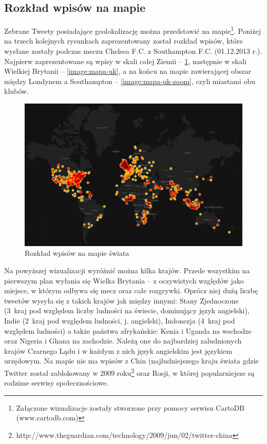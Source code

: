 

\clearpage
\subsection{Rozkład wpisów na mapie}
\label{subsection:rozkladnamapie}
Zebrane Tweety posiadające geolokalizację można przedstawić na
mapie\footnote{Załączone wizualizacje zostały stworzone przy pomocy serwisu
CartoDB (www.cartodb.com)}.
Poniżej na trzech kolejnych rysunkach zaprezentowany został rozkład wpisów,
które wysłane zostały podczas meczu Chelsea F.C. z Southampton F.C.
(01.12.2013 r.). Najpierw zaprezentowane są wpisy w skali całej Ziemii --
\ref{image:mapa-swiata}, następnie w skali Wielkiej Brytanii --
\ref{image:mapa-uk}, a na końcu na mapie zawierającej obszar między Londynem a
Southampton -- \ref{image:mapa-uk-zoom}, czyli miastami obu klubów.

\begin{figure}[ht!]
\centering
\includegraphics[width=140mm]{img/geo-chelsea-southampton.png}
\caption{Rozkład wpisów na mapie świata}
\label{image:mapa-swiata}
\end{figure}

Na powyższej wizualizacji wyróżnić można kilka krajów. Przede wszystkim na
pierwszym plan wyłania się Wielka Brytania -- z oczywistych względów jako
miejsce, w którym odbywa się mecz oraz całe rozgrywki. Oprócz niej dużą liczbę
tweetów wysyła się z takich krajów jak między innymi:
Stany Zjednoczone (3~kraj pod względem liczby ludności na świecie, dominujący
język angielski), Indie (2~kraj pod względem ludności, j. angielski), Indonezja
(4~kraj pod względem ludności) a także państwa afrykańskie: Kenia i Uganda na
wschodze oraz Nigeria i Ghana na zachodzie. Należą one do najbardziej
zaludnionych krajów Czarnego Lądu i w każdym z nich język angielskim jest
językiem urzędowym.
Na mapie nie ma wpisów z Chin (najludniejszego kraju świata gdzie Twitter
został zablokowany w 2009
roku\footnote{http://www.theguardian.com/technology/2009/jun/02/twitter-china}
oraz Rosji, w której popularniejsze są rodzime serwisy społecznościowe.

